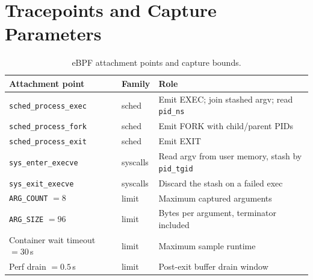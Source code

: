 \documentclass[11pt,a4paper]{article}
\newcommand{\code}[1]{\texttt{\small #1}}
\begin{document}
\section{Tracepoints and Capture Parameters}

\begin{table}[H]
\centering\footnotesize
\begin{tabular}{@{}llp{60mm}@{}}
\toprule
\textbf{Attachment point} & \textbf{Family} & \textbf{Role} \\
\midrule
\code{sched\_process\_exec} & sched & Emit EXEC; join stashed argv; read
  \code{pid\_ns} \\
\code{sched\_process\_fork} & sched & Emit FORK with child/parent PIDs \\
\code{sched\_process\_exit} & sched & Emit EXIT \\
\code{sys\_enter\_execve} & syscalls & Read argv from user memory, stash by
  \code{pid\_tgid} \\
\code{sys\_exit\_execve}  & syscalls & Discard the stash on a failed exec \\
\midrule
\code{ARG\_COUNT} $=8$ & limit & Maximum captured arguments \\
\code{ARG\_SIZE} $=96$ & limit & Bytes per argument, terminator included \\
Container wait timeout $=30$\,s & limit & Maximum sample runtime \\
Perf drain $=0.5$\,s & limit & Post-exit buffer drain window \\
\bottomrule
\end{tabular}
\caption{eBPF attachment points and capture bounds.}
\end{table}
\end{document}
